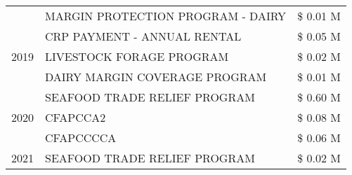 \begin{tabular}{llr}
 & MARGIN PROTECTION PROGRAM - DAIRY & \$ 0.01 M \\
\cline{1-3}
\multirow[t]{3}{*}{2019} & CRP PAYMENT - ANNUAL RENTAL & \$ 0.05 M \\
 & LIVESTOCK FORAGE PROGRAM & \$ 0.02 M \\
 & DAIRY MARGIN COVERAGE PROGRAM & \$ 0.01 M \\
\cline{1-3}
\multirow[t]{3}{*}{2020} & SEAFOOD TRADE RELIEF PROGRAM & \$ 0.60 M \\
 & CFAPCCA2 & \$ 0.08 M \\
 & CFAPCCCCA & \$ 0.06 M \\
\cline{1-3}
2021 & SEAFOOD TRADE RELIEF PROGRAM & \$ 0.02 M \\
\cline{1-3}
\bottomrule
\end{tabular}
